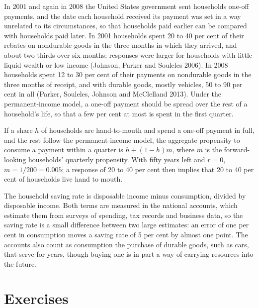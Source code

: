 \begin{record}
In 2001 and again in 2008 the United States government sent households one-off payments, and the date each household
received its payment was set in a way unrelated to its circumstances, so that households paid earlier can be compared
with households paid later. In 2001 households spent 20 to 40 per cent of their rebates on nondurable goods in the three
months in which they arrived, and about two thirds over six months; responses were larger for households with little
liquid wealth or low income (Johnson, Parker and Souleles 2006). In 2008 households spent 12 to 30 per cent of their payments on
nondurable goods in the three months of receipt, and with durable goods, mostly vehicles, 50 to 90 per cent in all
(Parker, Souleles, Johnson and McClelland 2013). Under the permanent-income model, a one-off payment should be spread over
the rest of a household's life, so that a few per cent at most is spent in the first quarter.
\end{record}

If a share $h$ of households are hand-to-mouth and spend a one-off payment in full, and the rest follow the permanent-income
model, the aggregate propensity to consume a payment within a quarter is $h + (1 - h)m$, where $m$ is the forward-looking households'
quarterly propensity. With fifty years left and $r = 0$, $m = 1/200 = 0.005$; a response of 20 to 40 per cent then implies that 20 to 40 per cent of
households live hand to mouth.

\begin{measure}
The household saving rate is disposable income minus consumption, divided by disposable income. Both terms are measured in
the national accounts, which estimate them from surveys of spending, tax records and business data, so the saving rate is
a small difference between two large estimates: an error of one per cent in consumption moves a saving rate of 5 per cent
by almost one point. The accounts also count as consumption the purchase of durable goods, such as cars, that serve for
years, though buying one is in part a way of carrying resources into the future.
\end{measure}

\section{Exercises}\label{sec:b2:consumption:exercises}

